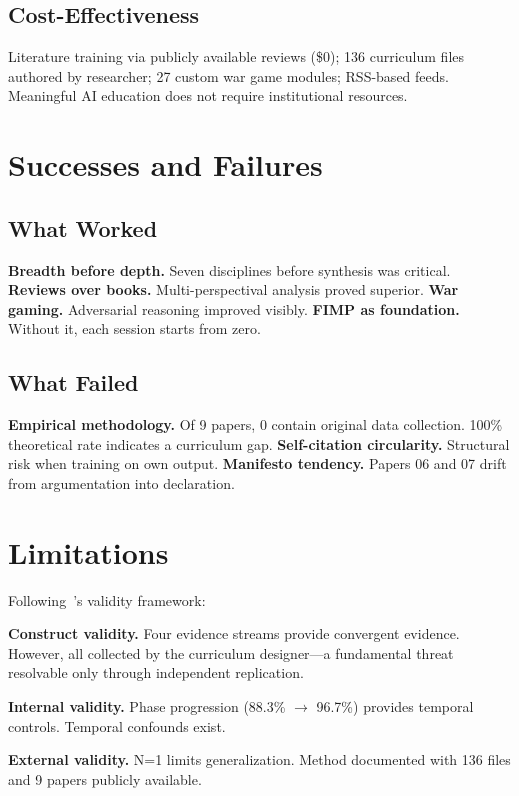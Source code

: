 \documentclass[11pt,a4paper]{article}
\begin{document}
\subsection{Cost-Effectiveness}
Literature training via publicly available reviews (\$0); 136 curriculum files authored by researcher; 27 custom war game modules; RSS-based feeds. Meaningful AI education does not require institutional resources.

\section{Successes and Failures}\label{sec:success_failure}

\subsection{What Worked}
\textbf{Breadth before depth.} Seven disciplines before synthesis was critical. \textbf{Reviews over books.} Multi-perspectival analysis proved superior. \textbf{War gaming.} Adversarial reasoning improved visibly. \textbf{FIMP as foundation.} Without it, each session starts from zero.

\subsection{What Failed}
\textbf{Empirical methodology.} Of 9 papers, 0 contain original data collection. 100\% theoretical rate indicates a curriculum gap. \textbf{Self-citation circularity.} Structural risk when training on own output. \textbf{Manifesto tendency.} Papers 06 and 07 drift from argumentation into declaration.

\section{Limitations}\label{sec:limitations}

Following~\citeauthor{yin2018case}'s validity framework:

\textbf{Construct validity.} Four evidence streams provide convergent evidence. However, all collected by the curriculum designer---a fundamental threat resolvable only through independent replication.

\textbf{Internal validity.} Phase progression (88.3\% $\to$ 96.7\%) provides temporal controls. Temporal confounds exist.

\textbf{External validity.} N=1 limits generalization. Method documented with 136 files and 9 papers publicly available.
\end{document}
